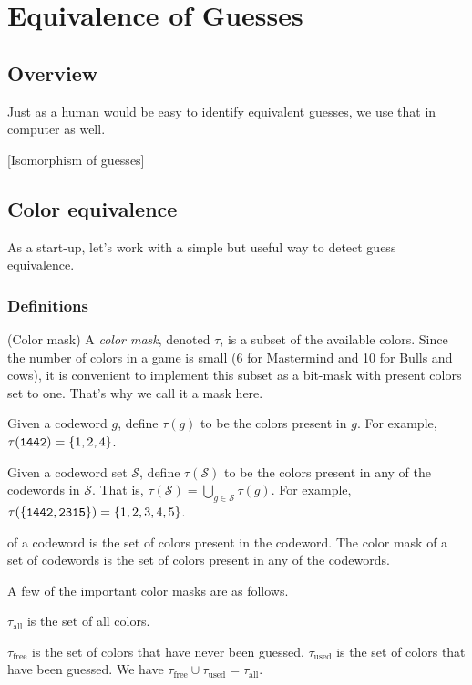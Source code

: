 \chapter{Equivalence of Guesses}

\section{Overview}

Just as a human would be easy to identify equivalent guesses, we use that in computer as well.

[Isomorphism of guesses]

\section{Color equivalence}

As a start-up, let's work with a simple but useful way to detect guess equivalence.

\subsection{Definitions}

\begin{definition}
(Color mask) A \emph{color mask}, denoted $\tau$, is a subset of the available colors. Since the number of colors in a game is small (6 for Mastermind and 10 for Bulls and cows), it is convenient to implement this subset as a bit-mask with present colors set to one. That's why we call it a mask here.
\end{definition}

Given a codeword $g$, define $\tau(g)$ to be the colors present in $g$. For example, $\tau(\texttt{1442}) = \{1, 2, 4\}$. 

Given a codeword set $\mathcal{S}$, define $\tau(\mathcal{S})$ to be the colors present in any of the codewords in $\mathcal{S}$. That is, $\tau(\mathcal{S}) = \bigcup_{g \in \mathcal{S}} \tau(g)$. For example, $\tau(\{\texttt{1442},\texttt{2315} \}) = \{ 1, 2, 3, 4, 5\}$.

of a codeword is the set of colors present in the codeword. The color mask of a set of codewords is the set of colors present in any of the codewords.

A few of the important color masks are as follows.

$\tau_{\text{all}}$ is the set of all colors.

$\tau_{\text{free}}$ is the set of colors that have never been guessed. $\tau_{\text{used}}$ is the set of colors that have been guessed. We have $\tau_{\text{free}} \cup \tau_{\text{used}} = \tau_\text{all}$.

